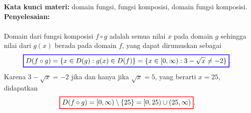 \documentclass[10pt,openany,a4paper]{article}
\theoremstyle{definition}
\theoremstyle{definition}
\theoremstyle{plain}
\newenvironment{jawab}[2][tes]{%
\par\noindent\textbf{Kata kunci materi:} #1.\\
\textbf{Penyelesaian:} #2%
}{}
\begin{document}
\begin{enumerate}
\begin{jawab}[domain fungsi, fungsi komposisi, domain fungsi komposisi]
{\begin{enumerate}
\begin{align*}
            \end{align*}
            Domain dari fungsi komposisi $f\circ g$ adalah semua nilai $x$ pada domain $g$ sehingga nilai dari $g(x)$ berada pada domain $f$, yang dapat dirumuskan sebagai
            \begin{align*}
                \colorlet{oldcolor}{.}
        \color{blue}
        \setlength{\fboxrule}{1pt} \boxed{\color{oldcolor}D(f\circ g) = \{x \in D(g) : g(x) \in D(f)\} = \{x \in [0, \infty) : 3 - \sqrt{x} \neq -2\}}\color{oldcolor}.
            \end{align*}
            Karena $3 - \sqrt{x} = -2$ jika dan hanya jika $\sqrt{x} = 5$, yang berarti $x = 25$, didapatkan
            \begin{align*}
                \colorlet{oldcolor}{.}
        \color{red}
        \setlength{\fboxrule}{1pt} \boxed{\color{oldcolor}D(f\circ g) = [0, \infty) \setminus \{25\} = [0, 25) \cup (25, \infty)}\color{oldcolor}.
            \end{align*}
        \end{enumerate}
    }
    \end{jawab}


\end{enumerate}
\end{document}
